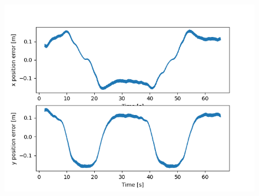 \documentclass{beamer}
\begin{document}
\begin{frame}[allowframebreaks]
\begin{columns}
\begin{figure}[H]
    \centering
    \includegraphics[scale=0.3]{img/dwa_screenshots/Position_Error.png}
\end{figure}

\end{columns}

\end{frame}

\end{document}
